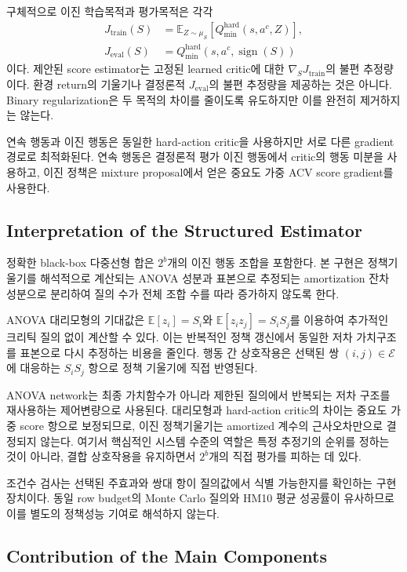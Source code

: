 \documentclass[10pt,journal]{IEEEtran}
\newcommand{\E}{\mathbb{E}}
\begin{document}
구체적으로 이진 학습목적과 평가목적은 각각
\begin{align}
J_{\mathrm{train}}(S)
&=\E_{Z\sim\mu_S}
[Q_{\min}^{\mathrm{hard}}(s,a^c,Z)],\\
J_{\mathrm{eval}}(S)
&=Q_{\min}^{\mathrm{hard}}
(s,a^c,\operatorname{sign}(S))
\end{align}
이다. 제안된 score estimator는 고정된 learned critic에 대한 $\nabla_SJ_{\mathrm{train}}$의 불편 추정량이다. 환경 return의 기울기나 결정론적 $J_{\mathrm{eval}}$의 불편 추정량을 제공하는 것은 아니다. Binary regularization은 두 목적의 차이를 줄이도록 유도하지만 이를 완전히 제거하지는 않는다.

연속 행동과 이진 행동은 동일한 hard-action critic을 사용하지만 서로 다른 gradient 경로로 최적화된다. 연속 행동은 결정론적 평가 이진 행동에서 critic의 행동 미분을 사용하고, 이진 정책은 mixture proposal에서 얻은 중요도 가중 ACV score gradient를 사용한다.


\subsection{Interpretation of the Structured Estimator}

정확한 black-box 다중선형 합은 $2^b$개의 이진 행동 조합을 포함한다. 본 구현은 정책기울기를 해석적으로 계산되는 ANOVA 성분과 표본으로 추정되는 amortization 잔차 성분으로 분리하여 질의 수가 전체 조합 수를 따라 증가하지 않도록 한다.

ANOVA 대리모형의 기대값은
$\E[z_i]=S_i$와 $\E[z_iz_j]=S_iS_j$를 이용하여 추가적인 크리틱 질의 없이 계산할 수 있다. 이는 반복적인 정책 갱신에서 동일한 저차 가치구조를 표본으로 다시 추정하는 비용을 줄인다. 행동 간 상호작용은 선택된 쌍 $(i,j)\in\mathcal{E}$에 대응하는 $S_iS_j$ 항으로 정책 기울기에 직접 반영된다.

ANOVA network는 최종 가치함수가 아니라 제한된 질의에서 반복되는 저차 구조를 재사용하는 제어변량으로 사용된다. 대리모형과 hard-action critic의 차이는 중요도 가중 score 항으로 보정되므로, 이진 정책기울기는 amortized 계수의 근사오차만으로 결정되지 않는다. 여기서 핵심적인 시스템 수준의 역할은 특정 추정기의 순위를 정하는 것이 아니라, 결합 상호작용을 유지하면서 $2^b$개의 직접 평가를 피하는 데 있다.

조건수 검사는 선택된 주효과와 쌍대 항이 질의값에서 식별 가능한지를 확인하는 구현 장치이다. 동일 row budget의 Monte Carlo 질의와 HM10 평균 성공률이 유사하므로 이를 별도의 정책성능 기여로 해석하지 않는다.


\subsection{Contribution of the Main Components}
\end{document}
